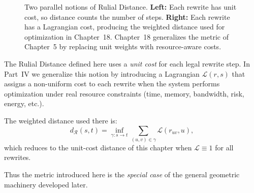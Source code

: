 \begin{figure}[h]
\centering
{}
\caption{Two parallel notions of Rulial Distance. \textbf{Left:} Each rewrite has unit cost, so distance counts the number of steps. \textbf{Right:} Each rewrite has a Lagrangian cost, producing the weighted distance used for optimization in Chapter~18. Chapter~18 generalizes the metric of Chapter~5 by replacing unit weights with resource-aware costs.}
\end{figure}

\begin{remark}
\label{remark-weighted-distance}
The Rulial Distance defined here uses a \emph{unit cost} for each legal rewrite step. In Part~IV we generalize this notion by introducing a Lagrangian $\mathcal{L}(r, s)$ that assigns a non-uniform cost to each rewrite when the system performs optimization under real resource constraints (time, memory, bandwidth, risk, energy, etc.).

The weighted distance used there is:
\[
d_{\mathcal{R}}(s,t)
  = \inf_{\gamma : s \to t} 
      \sum_{(u,v) \in \gamma} \mathcal{L}(r_{uv}, u),
\]
which reduces to the unit-cost distance of this chapter when $\mathcal{L} \equiv 1$ for all rewrites.

Thus the metric introduced here is the \emph{special case} of the general geometric machinery developed later.
\end{remark}

